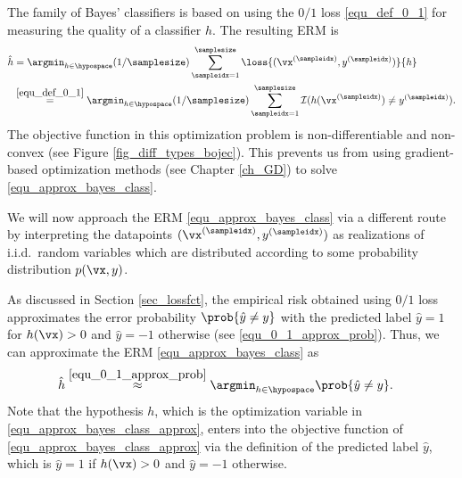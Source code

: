 \documentclass[12pt]{report}
\begin{document}
 The family of Bayes' classifiers is based on using the $0/1$ loss \eqref{equ_def_0_1} for 
 measuring the quality of a classifier $h$. The resulting ERM is 
\begin{align}
\label{equ_approx_bayes_class}
\hat{h} & = \argmin_{h \in \hypospace} (1/\samplesize) \sum_{\sampleidx=1}^{\samplesize} \loss{(\vx^{(\sampleidx)},y^{(\sampleidx)})}{h}   \nonumber \\ 
                      & \stackrel{\eqref{equ_def_0_1}}{=}  \argmin_{h \in \hypospace} (1/\samplesize) \sum_{\sampleidx=1}^{\samplesize} \mathcal{I} ( h(\vx^{(\sampleidx)}) \neq y^{(\sampleidx)}). %
\end{align}
The objective function in this optimization problem is non-differentiable 
and non-convex (see Figure \ref{fig_diff_types_bojec}). This prevents us 
from using gradient-based optimization methods (see Chapter \ref{ch_GD}) 
to solve \eqref{equ_approx_bayes_class}.

We will now approach the ERM \eqref{equ_approx_bayes_class} via a different 
route by interpreting the datapoints $(\vx^{(\sampleidx)},y^{(\sampleidx)})$ as 
realizations of i.i.d.\ random variables which are distributed according to some 
probability distribution $p(\vx,y)$. 

As discussed in Section \ref{sec_lossfct}, the empirical risk obtained using $0/1$ 
loss approximates the error probability $\prob { \hat{y} \neq y }$ with the predicted 
label $\hat{y} = 1$ for $h(\vx) > 0$ and $\hat{y} = -1$ otherwise (see \eqref{equ_0_1_approx_prob}). 
Thus, we can approximate the ERM \eqref{equ_approx_bayes_class} as 
\begin{align}
\label{equ_approx_bayes_class_approx}
\hat{h}    & \stackrel{\eqref{equ_0_1_approx_prob}}{\approx}\argmin_{h \in \hypospace} \prob{ \hat{y} \neq y} . 
\end{align}
Note that the hypothesis $h$, which is the optimization variable 
in \eqref{equ_approx_bayes_class_approx}, enters into the objective 
function of \eqref{equ_approx_bayes_class_approx} via the definition 
of the predicted label $\hat{y}$, which is $\hat{y} = 1 $ if $h(\vx) > 0$ 
and $\hat{y} =-1$ otherwise. 
\end{document}
